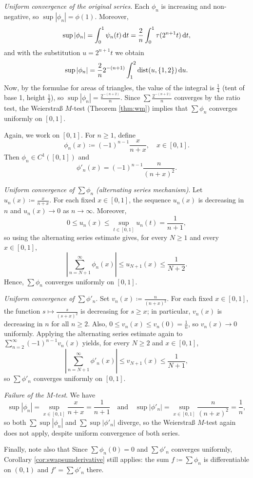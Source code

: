 \documentclass[../analysis1.tex]{subfiles}
\begin{document}
\begin{example}
\begin{center}
\begin{tikzpicture}[x=12cm, y=5cm, samples=200, scale=0.8]
        \end{tikzpicture}
    \end{center}
    \textit{Uniform convergence of the original series.} Each $\phi_n$ is increasing and non-negative, so $\sup|\phi_n|=\phi(1)$. Moreover,
    \[\sup|\phi_n|=\int_0^1 \psi_n(t)\d{t}=\frac{2}{n}\int_0^1\tau(2^{n+1}t)\d{t},\]
    and with the substitution $u=2^{n+1}t$ we obtain
    \[\sup|\phi_n|=\frac{2}{n}2^{-(n+1)}\int_1^{2}\mathrm{dist}(u,\{1,2\})\d{u}.\]
    Now, by the formulae for areas of triangles, the value of the integral is $\frac{1}{4}$ (tent of base 1, height $\frac{1}{2}$), so $\sup|\phi_n|=\frac{2^{-(n+2)}}{n}$. Since $\sum\frac{2^{-(n+2)}}{n}$ converges by the ratio test, the Weierstraß $M$-test (Theorem \ref{thm:wm}) implies that $\sum \phi_n$ converges uniformly on $[0,1]$.
\end{example}

\begin{example}
    Again, we work on $[0,1]$. For $n\ge 1$, define \[\phi_n(x)\coloneqq (-1)^{n-1}\frac{x}{n+x},\quad x\in[0,1].\]
    Then $\phi_n\in C^1([0,1])$ and \[\phi'_n(x)=(-1)^{n-1}\frac{n}{(n+x)^2}.\]
    
    \textit{Uniform convergence of $\sum \phi_n$ (alternating series mechanism)}. Let $u_n(x)\coloneqq \frac{x}{n+x}$. For each fixed $x\in[0,1]$, the sequence $u_n(x)$ is decreasing in $n$ and $u_n(x)\to 0$ as $n\to\infty$. Moreover, \[0\le u_n(x)\le \sup_{t\in[0,1]}u_n(t)=\frac{1}{n+1},\]
    so using the alternating series estimate gives, for every $N\ge 1$ and every $x\in [0,1]$,
    \[\left|\sum_{n=N+1}^{\infty}\phi_n(x)\right|\le u_{N+1}(x)\le \frac{1}{N+2}.\]
    Hence, $\sum \phi_n$ converges uniformly on $[0,1]$.
    
    \textit{Uniform convergence of $\sum \phi'_n$}. Set $v_n(x)\coloneqq \frac{n}{(n+x)^2}$. For each fixed $x\in[0,1]$, the function $s\mapsto \frac{s}{(s+x)^2}$ is decreasing for $s\ge x$; in particular, $v_n(x)$ is decreasing in $n$ for all $n\ge 2$. Also, $0\le v_n(x)\le v_n(0)=\frac{1}{n}$, so $v_n(x)\to 0$ uniformly. Applying the alternating series estimate again to $\sum_{n=2}^{\infty}(-1)^{n-1}v_n(x)$ yields, for every $N\ge 2$ and $x\in[0,1]$,
    \[\left|\sum_{n=N+1}^{\infty}\phi'_n(x)\right|\le v_{N+1}(x)\le\frac{1}{N+1},\]
    so $\sum \phi'_n$ converges uniformly on $[0,1]$.
    
    \textit{Failure of the $M$-test}. We have \[\sup|\phi_n| =\sup_{x\in[0,1]}\frac{x}{n+x}=\frac{1}{n+1}\quad\text{and}\quad \sup|\phi'_n|=\sup_{x\in[0,1]}\frac{n}{(n+x)^2}=\frac{1}{n},\]
    so both $\sum \sup|\phi_n|$ and $\sum \sup|\phi'_n|$ diverge, so the Weierstraß $M$-test again does not apply, despite uniform convergence of both series.

    Finally, note also that Since $\sum \phi_n(0)=0$ and $\sum \phi'_n$ converges uniformly, Corollary \ref{cor:swapsumderivative} still applies: the sum $f\coloneqq \sum\phi_n$ is differentiable on $(0,1)$ and $f'=\sum \phi'_n$ there.
\end{example}
\end{document}
